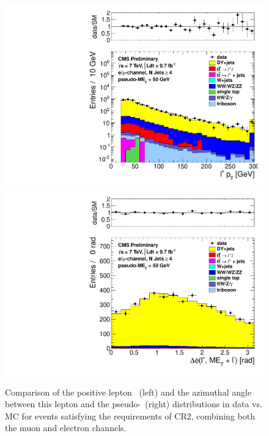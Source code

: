 \begin{figure}[hbt]
  \begin{center}
	\includegraphics[width=0.5\linewidth]{plots/CR2plots/leppt_scaled_met50_nj4_emucomb.pdf}%
	\includegraphics[width=0.5\linewidth]{plots/CR2plots/dphi_metl_scaled_met50_nj4_emucomb.pdf}
    \caption{
      Comparison of the positive lepton \pt\ (left) and the azimuthal angle between this lepton and the pseudo-\met\ (right) 
      distributions in data vs. MC for events satisfying the requirements of CR2, combining both the muon and
      electron channels. 
\label{fig:cr2lepptdphi} 
}  
      \end{center}
\end{figure}


